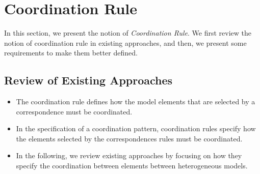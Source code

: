 \section{Coordination Rule}
In this section, we present the notion of \emph{Coordination Rule}. We first review the notion of coordination rule in existing approaches, and then, we present some requirements to make them better defined. 

\subsection{Review of Existing Approaches}
\begin{itemize}
	\item The coordination rule defines how the model elements that are selected by a correspondence  must be coordinated.
	
	
	\item In the specification of a coordination pattern, coordination rules specify how the elements selected by the correspondences rules must be coordinated.

	
	\item In the following, we review existing approaches by focusing on how they specify the coordination between elements between heterogeneous models.

\end{itemize}


